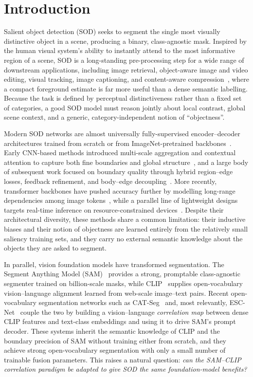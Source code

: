 \section{Introduction}
\label{sec:intro}

Salient object detection (SOD) seeks to segment the single most visually
distinctive object in a scene, producing a binary, class-agnostic mask. Inspired
by the human visual system's ability to instantly attend to the most informative
region of a scene, SOD is a long-standing pre-processing step for a wide range of
downstream applications, including image retrieval, object-aware image and video
editing, visual tracking, image captioning, and content-aware
compression~\cite{borji2015salient,wang2021salientsurvey}, where a compact
foreground estimate is far more useful than a dense semantic labelling. Because the
task is defined by perceptual distinctiveness rather than a fixed set of
categories, a good SOD model must reason jointly about local contrast, global
scene context, and a generic, category-independent notion of ``objectness''.

Modern SOD networks are almost universally fully-supervised encoder--decoder
architectures trained from scratch or from ImageNet-pretrained
backbones~\cite{basnet2019,f3net2020,ldf2020,vst2021,edn2022,menet2023}. Early
CNN-based methods introduced multi-scale aggregation and contextual attention to
capture both fine boundaries and global structure~\cite{picanet2018}, and a large
body of subsequent work focused on boundary quality through hybrid region--edge
losses, feedback refinement, and body--edge
decoupling~\cite{basnet2019,f3net2020,ldf2020}. More recently, transformer
backbones have pushed accuracy further by modelling long-range dependencies among
image tokens~\cite{vst2021,menet2023}, while a parallel line of lightweight
designs targets real-time inference on resource-constrained
devices~\cite{csnet2020,edn2022,sod_admnet,sod_bdfgnet,sod_stnet}. Despite their
architectural diversity, these methods share a common limitation: their inductive
biases and their notion of objectness are learned entirely from the relatively
small saliency training sets, and they carry no external semantic knowledge about
the objects they are asked to segment.

In parallel, vision foundation models have transformed segmentation. The
Segment Anything Model (SAM)~\cite{kirillov2023segment} provides a strong,
promptable class-agnostic segmenter trained on billion-scale masks, while
CLIP~\cite{radford2021learning} supplies open-vocabulary vision--language
alignment learned from web-scale image--text pairs. Recent open-vocabulary
segmentation networks such as CAT-Seg~\cite{cho2024cat} and, most relevantly,
ESC-Net~\cite{lee2024escnet} couple the two by building a vision--language
\emph{correlation map} between dense CLIP features and text-class embeddings and
using it to drive SAM's prompt decoder. These systems inherit the semantic
knowledge of CLIP and the boundary precision of SAM without training either from
scratch, and they achieve strong open-vocabulary segmentation with only a small
number of trainable fusion parameters. This raises a natural question:
\emph{can the SAM--CLIP correlation paradigm be adapted to give SOD the same
foundation-model benefits?}

